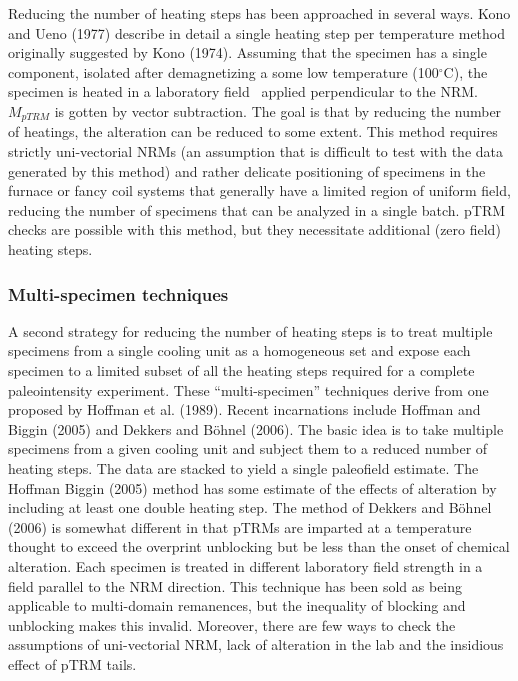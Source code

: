 Reducing the number of heating steps has been approached in several ways. 
 Kono and Ueno (1977) \nocite{kono77} describe in detail a  single heating step per temperature method  originally  suggested by
  Kono (1974).  \nocite{kono74} Assuming that the specimen has a single component, isolated after demagnetizing  a some low temperature (100$^{\circ}$C),   the specimen is heated in a laboratory field \ applied perpendicular to the NRM.  $M_{ pTRM}$ is gotten by vector subtraction.  The goal is that by reducing the number of heatings,  the alteration can be reduced  to some extent.  This method requires strictly uni-vectorial NRMs (an assumption that is difficult to test with the data generated by this method) and rather delicate positioning of specimens in the furnace or fancy coil systems that generally have a limited region of uniform field, reducing the number of specimens that can be analyzed in a single batch.    pTRM checks are possible with this method, but they necessitate additional (zero field) heating steps.   
 
 \subsubsection{Multi-specimen techniques}
 
A second strategy for reducing the number of heating steps is to treat multiple specimens from a single cooling unit as a homogeneous set and expose each specimen to a limited subset of all the heating steps required for a complete paleointensity experiment.   These ``multi-specimen'' techniques derive from one proposed by 
Hoffman  et al. (1989). \nocite{hoffman89}  Recent incarnations include  Hoffman and 
Biggin (2005) and   
Dekkers and B\"ohnel (2006).  \nocite{hoffman05,dekkers06}  The basic idea is to take multiple  specimens from a given cooling unit and subject them to a reduced number of heating steps.    The data are stacked to yield a single paleofield estimate.  The Hoffman Biggin (2005) method has some estimate of the effects of alteration by including at least one double heating step.  The method of Dekkers and B\"ohnel (2006) is somewhat different in that pTRMs are imparted at a temperature thought to exceed the overprint unblocking but be less than the onset of chemical alteration.  Each specimen is treated in different laboratory field strength in  a field parallel to the NRM direction.    This technique has been sold as being applicable to multi-domain remanences, but the inequality of blocking and unblocking makes this invalid.   Moreover, there are few ways to check the assumptions of uni-vectorial NRM, lack of alteration in the lab and the insidious effect of pTRM tails.   



